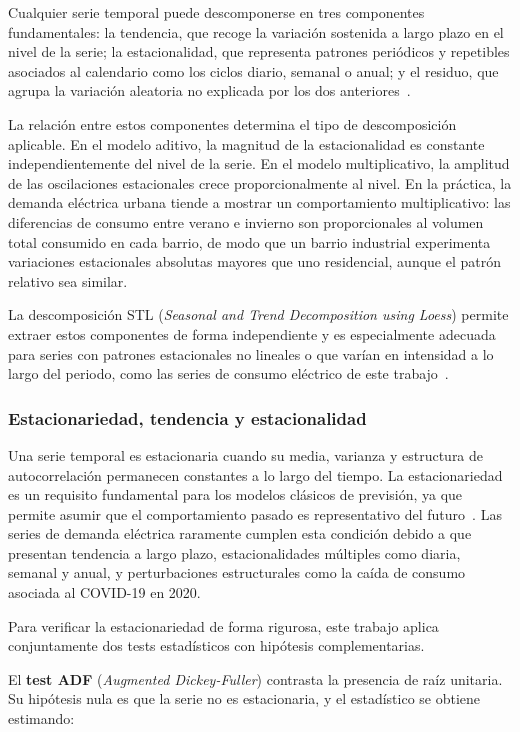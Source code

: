 \documentclass[12pt, a4paper]{article}
\begin{document}
Cualquier serie temporal puede descomponerse en tres componentes fundamentales: la tendencia, que recoge la variación sostenida a largo plazo en el nivel de la serie; la estacionalidad, que representa patrones periódicos y repetibles asociados al calendario como los ciclos diario, semanal o anual; y el residuo, que agrupa la variación aleatoria no explicada por los dos anteriores~\cite{hyndman2021}.

La relación entre estos componentes determina el tipo de descomposición aplicable. En el modelo aditivo, la magnitud de la estacionalidad es constante independientemente del nivel de la serie. En el modelo multiplicativo, la amplitud de las oscilaciones estacionales crece proporcionalmente al nivel. En la práctica, la demanda eléctrica urbana tiende a mostrar un comportamiento multiplicativo: las diferencias de consumo entre verano e invierno son proporcionales al volumen total consumido en cada barrio, de modo que un barrio industrial experimenta variaciones estacionales absolutas mayores que uno residencial, aunque el patrón relativo sea similar.

La descomposición STL (\textit{Seasonal and Trend Decomposition using Loess}) permite extraer estos componentes de forma independiente y es especialmente adecuada para series con patrones estacionales no lineales o que varían en intensidad a lo largo del periodo, como las series de consumo eléctrico de este trabajo~\cite{hyndman2021}.

\subsubsection{Estacionariedad, tendencia y estacionalidad}

Una serie temporal es estacionaria cuando su media, varianza y estructura de autocorrelación permanecen constantes a lo largo del tiempo. La estacionariedad es un requisito fundamental para los modelos clásicos de previsión, ya que permite asumir que el comportamiento pasado es representativo del futuro~\cite{hyndman2021}. Las series de demanda eléctrica raramente cumplen esta condición debido a que presentan tendencia a largo plazo, estacionalidades múltiples como diaria, semanal y anual, y perturbaciones estructurales como la caída de consumo asociada al COVID-19 en 2020.

Para verificar la estacionariedad de forma rigurosa, este trabajo aplica conjuntamente dos tests estadísticos con hipótesis complementarias.

El \textbf{test ADF} (\textit{Augmented Dickey-Fuller}) contrasta la presencia de raíz unitaria. Su hipótesis nula es que la serie no es estacionaria, y el estadístico se obtiene estimando:
\end{document}
